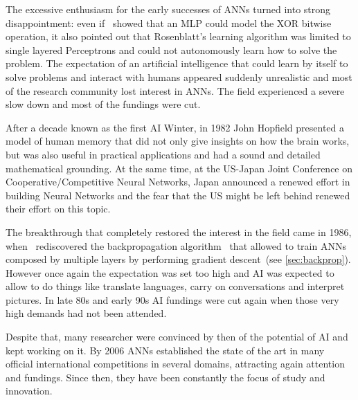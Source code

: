 The excessive enthusiasm for the early successes of ANNs turned into strong
disappointment: even if~\cite{Minsky69} showed that an MLP could model the XOR
bitwise operation, it also pointed out that Rosenblatt's learning algorithm was
limited to single layered Perceptrons and could not autonomously learn how to
solve the problem. The expectation of an artificial intelligence that could
learn by itself to solve problems and interact with humans appeared suddenly
unrealistic and most of the research community lost interest in ANNs. The field
experienced a severe slow down and most of the fundings were cut.

After a decade known as the first AI Winter, in 1982 John Hopfield presented a
model of human memory that did not only give insights on how the brain works,
but was also useful in practical applications and had a sound and detailed
mathematical grounding. At the same time, at the US-Japan Joint Conference on
Cooperative/Competitive Neural Networks, Japan announced a renewed effort in
building Neural Networks and the fear that the US might be left behind renewed
their effort on this topic.

The breakthrough that completely restored the interest in the field came in
1986, when~\cite{Rumelhart86b} rediscovered the backpropagation
algorithm~\citep{Linnainmaa70,Werbos74} that allowed to train ANNs composed by
multiple layers by performing gradient descent~(see \autoref{sec:backprop}).
However once again the expectation was set too high and AI was expected to
allow to do things like translate languages, carry on conversations and
interpret pictures. In late 80s and early 90s AI fundings were cut again when
those very high demands had not been attended.

Despite that, many researcher were convinced by then of the potential of AI
and kept working on it. By 2006 ANNs established the state of the art in many
official international competitions in several domains, attracting again
attention and fundings. Since then, they have been constantly the focus of
study and innovation.


